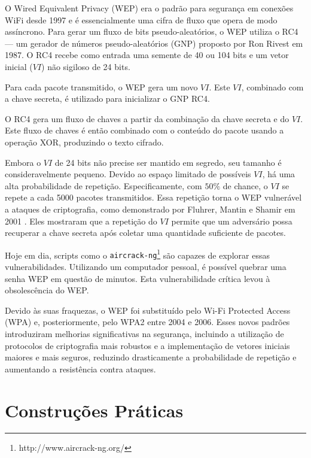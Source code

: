 
\begin{example}
  O Wired Equivalent Privacy (WEP) era o padrão para segurança em conexões WiFi desde 1997 e é essencialmente uma cifra de fluxo que opera de modo assíncrono.
  Para gerar um fluxo de bits pseudo-aleatórios, o WEP utiliza o RC4 \cite{Rivest16} — um gerador de números pseudo-aleatórios (GNP) proposto por Ron Rivest em 1987.
  O RC4 recebe como entrada uma semente de 40 ou 104 bits e um vetor inicial ($VI$) não sigiloso de 24 bits.

  Para cada pacote transmitido, o WEP gera um novo $VI$.
  Este $VI$, combinado com a chave secreta, é utilizado para inicializar o GNP RC4.

  O RC4 gera um fluxo de chaves a partir da combinação da chave secreta e do $VI$.
  Este fluxo de chaves é então combinado com o conteúdo do pacote usando a operação XOR, produzindo o texto cifrado.

  Embora o $VI$ de 24 bits não precise ser mantido em segredo, seu tamanho é consideravelmente pequeno.
  Devido ao espaço limitado de possíveis $VI$, há uma alta probabilidade de repetição.
  Especificamente, com $50\%$ de chance, o $VI$ se repete a cada 5000 pacotes transmitidos.
  Essa repetição torna o WEP vulnerável a ataques de criptografia, como demonstrado por Fluhrer, Mantin e Shamir em 2001 \cite{Fluhrer01}.
  Eles mostraram que a repetição do $VI$ permite que um adversário possa recuperar a chave secreta após coletar uma quantidade suficiente de pacotes.

  Hoje em dia, scripts como o {\tt aircrack-ng}\footnote{http://www.aircrack-ng.org/} são capazes de explorar essas vulnerabilidades.
  Utilizando um computador pessoal, é possível quebrar uma senha WEP em questão de minutos.
  Esta vulnerabilidade crítica levou à obsolescência do WEP.

  Devido às suas fraquezas, o WEP foi substituído pelo Wi-Fi Protected Access (WPA) e, posteriormente, pelo WPA2 entre 2004 e 2006.
  Esses novos padrões introduziram melhorias significativas na segurança, incluindo a utilização de protocolos de criptografia mais robustos e a implementação de vetores iniciais maiores e mais seguros, reduzindo drasticamente a probabilidade de repetição e aumentando a resistência contra ataques.

\end{example}

\section{Construções Práticas}
\label{sec:construcoes-praticas}

